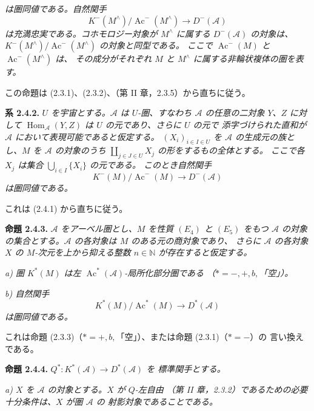 \clearpage
{}%
\begingroup\small\setlength{\parskip}{0pt}\setlength{\emergencystretch}{1.5em}
\setlength{\abovedisplayskip}{4pt plus 2pt minus 2pt}%
\setlength{\belowdisplayskip}{4pt plus 2pt minus 2pt}%

\noindent\textit{は圏同値である。自然関手}
\[
K^{-}(M^{\wedge})/\operatorname{Ac}^{-}(M^{\wedge})
\longrightarrow D^{-}(\mathcal A)
\]
\noindent\textit{は充満忠実である。コホモロジー対象が $M^{\wedge}$ に属する
$D^{-}(\mathcal A)$ の対象は、
$K^{-}(M^{\wedge})/\operatorname{Ac}^{-}(M^{\wedge})$ の対象と同型である。
ここで $\operatorname{Ac}^{-}(M)$ と $\operatorname{Ac}^{-}(M^{\wedge})$ は、
その成分がそれぞれ $M$ と $M^{\wedge}$ に属する非輪状複体の圏を表す。}

この命題は (2.3.1)、(2.3.2)、（第 II 章，2.3.5）から直ちに従う。

\medskip\noindent\textbf{系 2.4.2.}\quad
\textit{$U$ を宇宙とする。$\mathcal A$ は $U$-圏、すなわち
$\mathcal A$ の任意の二対象 $Y$、$Z$ に対して
$\operatorname{Hom}_{\mathcal A}(Y,Z)$ は $U$ の元であり、さらに $U$ の元で
添字づけられた直和が $\mathcal A$ において表現可能であると仮定する。
$(X_i)_{i\in I\in U}$ を $\mathcal A$ の生成元の族とし、$M$ を
$\mathcal A$ の対象のうち $\coprod_{j\in J\in U}X_j$ の形をするもの全体とする。
ここで各 $X_j$ は集合 $\bigcup_{i\in I}\{X_i\}$ の元である。
このとき自然関手}
\[
K^{-}(M)/\operatorname{Ac}^{-}(M)\longrightarrow D^{-}(\mathcal A)
\]
\noindent\textit{は圏同値である。}

これは (2.4.1) から直ちに従う。

\medskip\noindent\textbf{命題 2.4.3.}\quad
\textit{$\mathcal A$ をアーベル圏とし、$M$ を性質 $(E_4)$ と $(E_5)$ をもつ
$\mathcal A$ の対象の集合とする。$\mathcal A$ の各対象は $M$ のある元の商対象であり、
さらに $\mathcal A$ の各対象 $X$ の $M$-次元を上から抑える整数
$n\in\mathbb N$ が存在すると仮定する。}

\noindent\textit{a) 圏 $K^{*}(M)$ は左
$\operatorname{Ac}^{*}(\mathcal A)$-局所化部分圏である
（$*=-,+,b,{}$「空」）。}

\noindent\textit{b) 自然関手}
\[
K^{*}(M)/\operatorname{Ac}^{*}(M)\longrightarrow D^{*}(\mathcal A)
\]
\noindent\textit{は圏同値である。}

これは命題 (2.3.3)（$*=+,b,{}$「空」）、または命題 (2.3.1)（$*=-$）の
言い換えである。

\medskip\noindent\textbf{命題 2.4.4.}\quad
\textit{$Q^{*}\colon K^{*}(\mathcal A)\longrightarrow D^{*}(\mathcal A)$ を
標準関手とする。}

\noindent\textit{a) $X$ を $\mathcal A$ の対象とする。$X$ が $Q$-左自由
（第 II 章，2.3.2）であるための必要十分条件は、$X$ が圏 $\mathcal A$ の
射影対象であることである。}
\endgroup
